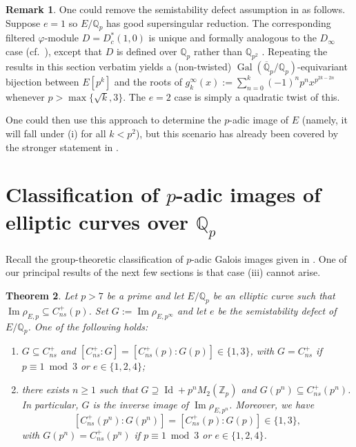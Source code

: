 \documentclass{amsart}
\newcommand{\op}[1]{\operatorname{#1}}
\newcommand{\Qp}{\mathbb{Q}_p}
\newtheorem{theorem}{Theorem}
\theoremstyle{definition}
\newtheorem{remark}[theorem]{Remark}
\newcommand{\Z}{\mathbb{Z}}
\newcommand{\Q}{\mathbb{Q}}
\newcommand{\Gal}{\operatorname{Gal}}
\newcommand{\NRep}[1]{\operatorname{Im}\rho_{E,#1}}
\numberwithin{theorem}{section}
\numberwithin{equation}{section}
\begin{document}
\begin{remark}\label{rmk: alternative division polynomials for small e}
One could remove the semistability defect assumption in  as follows. Suppose $e=1$ so $E/\Qp$ has good supersingular reduction. The corresponding filtered $\varphi$-module $D=D_c^\ast(1,0)$ is unique and formally analogous to the $D_\infty$ case (cf.~), except that $D$ is defined over $\Qp$ rather than $\Q_{p^2}$ \cite[p.~117]{Volkov}. Repeating the results in this section verbatim yields a (non-twisted) $\Gal(\overline{\Q}_p/\Q_p)$-equivariant bijection between $E[p^k]$ and the roots of $g_k^\infty(x) := \sum_{n=0}^k (-1)^n p^n x^{p^{2k-2n}}$ whenever $p>\max\{\sqrt{k},3\}$. The $e=2$ case is simply a quadratic twist of this. 

One could then use this approach to determine the $p$-adic image of $E$ (namely, it will fall under (i) for all $k<p^2$), but this scenario has already been covered by the stronger statement in .
\end{remark}


\section{Classification of $p$-adic images of elliptic curves over $\Q_p$}\label{sect: integral Tate module}

Recall the group-theoretic classification of $p$-adic Galois images given in . One of our principal results of the next few sections is that case (iii) cannot arise.

\begin{theorem}\label{thm: no sharp group over Qp}
Let $p>7$ be a prime and let $E/\Q_p$ be an elliptic curve such that $\NRep{p} \subseteq C_{ns}^+(p)$. Set $G:=\operatorname{Im}\rho_{E,p^\infty}$ and let $e$ be the semistability defect of $E/\Q_p$. 
One of the following holds:
	\begin{enumerate}
		\item $G \subseteq C_{ns}^+$ and $[C_{ns}^+ : G] =[C_{ns}^+(p):G(p)] \in \{1,3\}$, with $G = C_{ns}^+$ if $p \equiv 1 \bmod 3$ or $e \in\{1,2,4\}$;
		\item there exists $n \ge 1$ such that $G \supseteq \op{Id} + p^n M_{2}(\Z_p)$ and $G(p^n) \subseteq C_{ns}^+(p^n)$. In particular, $G$ is the inverse image of $\operatorname{Im} \rho_{E, p^n}$. Moreover, we have 
        \[
        [C_{ns}^+(p^n) : G(p^n)] =[C_{ns}^+(p):G(p)] \in \{1,3\},
        \]
        with $G(p^n) = C_{ns}^+(p^n)$ if $p \equiv 1 \bmod 3$ or $e \in\{1,2,4\}$.
	\end{enumerate}
\end{theorem}
\end{document}
